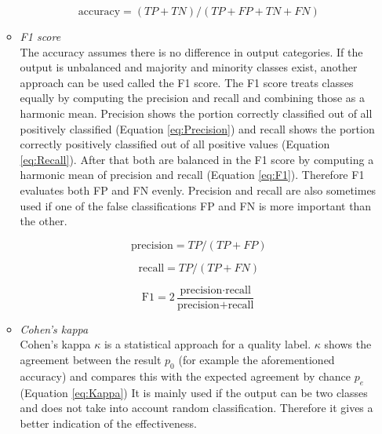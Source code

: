 \documentclass[10pt,a4paper]{report}
\begin{document}
\begin{itemize}
\begin{itemize}
			\begin{equation}\label{eq:Accuracy}
			\text{accuracy} = (TP + TN) / (TP + FP + TN + FN)
			\end{equation}
			
			\item \textit{F1 score} \\
			The accuracy assumes there is no difference in output categories. If the output is unbalanced and majority and minority classes exist, another approach can be used called the F1 score. The F1 score treats classes equally by computing the precision and recall and combining those as a harmonic mean. Precision shows the portion correctly classified out of all positively classified (Equation \ref{eq:Precision}) and recall shows the portion correctly positively classified out of all positive values (Equation \ref{eq:Recall}). After that both are balanced in the F1 score by computing a harmonic mean of precision and recall (Equation \ref{eq:F1}). Therefore F1 evaluates both FP and FN evenly. Precision and recall are also sometimes used if one of the false classifications FP and FN is more important than the other.
			
			\begin{equation}\label{eq:Precision}
			\text{precision} = TP / (TP + FP)
			\end{equation}
			
			\begin{equation}\label{eq:Recall}
			\text{recall} = TP / (TP + FN)
			\end{equation}
			
			\begin{equation}\label{eq:F1}
			\text{F1} = 2 \frac{\text{precision} \cdot \text{recall}}{\text{precision} + \text{recall}}
			\end{equation}
			
			\item \textit{Cohen's kappa} \\
			Cohen's kappa $\kappa$ is a statistical approach for a quality label. $\kappa$ shows the agreement between the result $p_0$ (for example the aforementioned accuracy) and compares this with the expected agreement by chance $p_e$ (Equation \ref{eq:Kappa}) It is mainly used if the output can be two classes\cite{blackman2000interval} and does not take into account random classification. Therefore it gives a better indication of the effectiveness.
			

\end{itemize}
\end{itemize}
\end{document}
